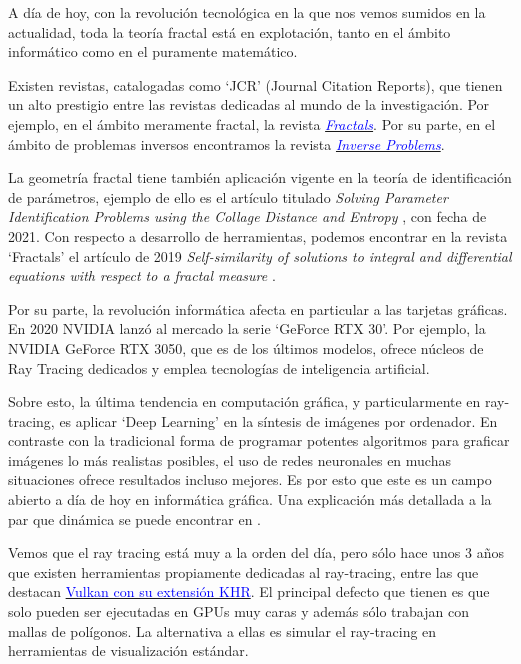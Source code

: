 A día de hoy, con la revolución tecnológica en la que nos vemos sumidos en la actualidad, toda la teoría fractal está en explotación, tanto en el ámbito informático como en el puramente matemático.

Existen revistas, catalogadas como `JCR' (Journal Citation Reports), que tienen un alto prestigio entre las revistas dedicadas al mundo de la investigación. Por ejemplo, en el ámbito meramente fractal, la revista \href{https://www.worldscientific.com/worldscinet/fractals}{\textcolor{blue}{\textit{Fractals}}}. Por su parte, en el ámbito de problemas inversos encontramos la revista \href{https://iopscience.iop.org/journal/0266-5611}{\textcolor{blue}{\textit{Inverse Problems}}}.

La geometría fractal tiene también aplicación vigente en la teoría de identificación de parámetros, ejemplo de ello es el artículo titulado \textit{Solving Parameter Identification Problems using the Collage Distance and Entropy} \cite{LaTorre}, con fecha de 2021. Con respecto a desarrollo de herramientas, podemos encontrar en la revista `Fractals' el artículo de 2019 \textit{Self-similarity of solutions to integral and differential equations with respect to a fractal measure} \cite{LaTorre2019}.

Por su parte, la revolución informática afecta en particular a las tarjetas gráficas.  En 2020 NVIDIA lanzó al mercado la serie `GeForce RTX 30'. Por ejemplo, la NVIDIA GeForce RTX 3050, que es de los últimos modelos, ofrece núcleos de Ray Tracing dedicados y emplea tecnologías de inteligencia artificial.

Sobre esto, la última tendencia en computación gráfica, y particularmente en ray-tracing, es aplicar `Deep Learning' en la síntesis de imágenes por ordenador. En contraste con la tradicional forma de programar potentes algoritmos para graficar imágenes lo más realistas posibles, el uso de redes neuronales en muchas situaciones ofrece resultados incluso mejores. Es por esto que este es un campo abierto a día de hoy en informática gráfica. Una explicación más detallada a la par que dinámica se puede encontrar en \cite{RT-AI}.

Vemos que el ray tracing está muy a la orden del día, pero sólo hace unos 3 años que existen herramientas propiamente dedicadas al ray-tracing, entre las que destacan \href{https://nvpro-samples.github.io/vk_raytracing_tutorial_KHR/}{\textcolor{blue}{Vulkan con su extensión KHR}}. El principal defecto que tienen es que solo pueden ser ejecutadas en GPUs muy caras y además sólo trabajan con mallas de polígonos. La alternativa a ellas es simular el ray-tracing en herramientas de visualización estándar.

